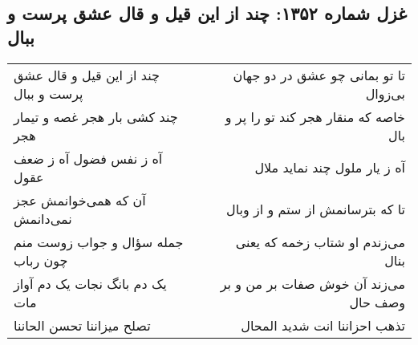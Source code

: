 \begin{center}
\section*{غزل شماره ۱۳۵۲: چند از این قیل و قال عشق پرست و ببال}
\label{sec:1352}
\begin{longtable}{l p{0.5cm} r}
چند از این قیل و قال عشق پرست و ببال
&&
تا تو بمانی چو عشق در دو جهان بی‌زوال
\\
چند کشی بار هجر غصه و تیمار هجر
&&
خاصه که منقار هجر کند تو را پر و بال
\\
آه ز نفس فضول آه ز ضعف عقول
&&
آه ز یار ملول چند نماید ملال
\\
آن که همی‌خوانمش عجز نمی‌دانمش
&&
تا که بترسانمش از ستم و از وبال
\\
جمله سؤال و جواب زوست منم چون رباب
&&
می‌زندم او شتاب زخمه که یعنی بنال
\\
یک دم بانگ نجات یک دم آواز مات
&&
می‌زند آن خوش صفات بر من و بر وصف حال
\\
تصلح میزاننا تحسن الحاننا
&&
تذهب احزاننا انت شدید المحال
\\
\end{longtable}
\end{center}

